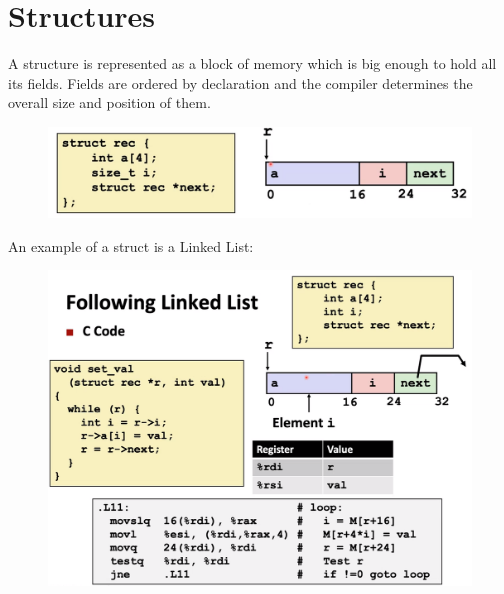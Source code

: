 \documentclass[12pt]{book}
\title{\coursetitle\linebreak\lecturename}
\author{\\Cain Susko\\ 
           \\ \\ \\
      Queen's University 
    \\School of Computing\\}
\begin{document}
\begin{titlepage}
        \maketitle
\end{titlepage}


\section*{Structures}
A structure is represented as a block of memory which is big enough to hold all its fields.
Fields are ordered by declaration and the compiler determines the overall size and position
of them.
\begin{figure}[h]
        \centering
        \includegraphics[scale = 0.45]{./figures/struct}
\end{figure}

An example of a struct is a Linked List:
\begin{figure}[h]
        \centering
        \includegraphics[scale = 0.4]{./figures/linkedlist}
\end{figure}
\end{document}

